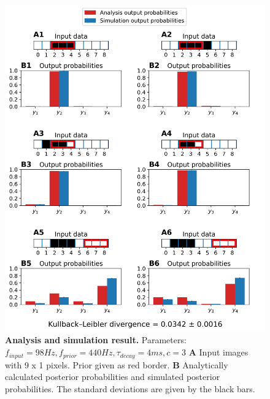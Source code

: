 \begin{figure}
  \includegraphics[width=\linewidth]{figures/1D/training/trainingEvaluation_98_440_4_c3.png}
      \caption{\textbf{Analysis and simulation result. } Parameters: $f_{input} = 98 Hz, f_{prior} = 440 Hz, \tau_{decay} = 4 ms, c = 3$ \textbf{A} Input images with 9 x 1 pixels. Prior given as red border. \textbf{B} Analytically calculated posterior probabilities and simulated posterior probabilities. The standard deviations are given by the black bars.}  
  \label{fig:1DTrainingEvaluationC3}
\end{figure}

